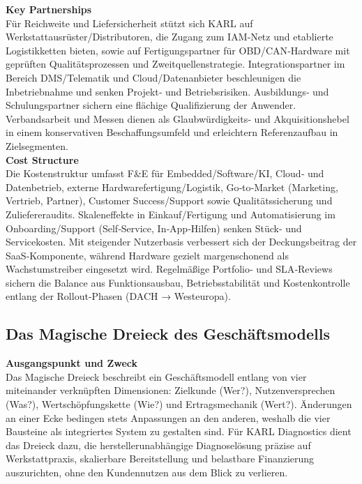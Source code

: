 \textbf{Key Partnerships}\\
Für Reichweite und Liefersicherheit stützt sich \ac{KARL} auf Werkstattausrüster/Distributoren, die Zugang zum \ac{IAM}‑Netz und etablierte Logistikketten bieten, sowie auf Fertigungspartner für \ac{OBD}/\ac{CAN}‑Hardware mit geprüften Qualitätsprozessen und Zweitquellenstrategie. Integrationspartner im Bereich \ac{DMS}/Telematik und Cloud/Datenanbieter beschleunigen die Inbetriebnahme und senken Projekt‑ und Betriebsrisiken. Ausbildungs‑ und Schulungspartner sichern eine flächige Qualifizierung der Anwender. Verbandsarbeit und Messen dienen als Glaubwürdigkeits‑ und Akquisitionshebel in einem konservativen Beschaffungsumfeld und erleichtern Referenzaufbau in Zielsegmenten. \\

\textbf{Cost Structure} \\
Die Kostenstruktur umfasst F\&E für Embedded/Software/\ac{KI}, Cloud‑ und Datenbetrieb, externe Hardwarefertigung/Logistik, Go‑to‑Market (Marketing, Vertrieb, Partner), Customer Success/Support sowie Qualitätssicherung und Zuliefereraudits. Skaleneffekte in Einkauf/Fertigung und Automatisierung im Onboarding/Support (Self‑Service, In‑App‑Hilfen) senken Stück- und Servicekosten. Mit steigender Nutzerbasis verbessert sich der Deckungsbeitrag der \ac{SaaS}‑Komponente, während Hardware gezielt margenschonend als Wachstumstreiber eingesetzt wird. Regelmäßige Portfolio‑ und \ac{SLA}‑Reviews sichern die Balance aus Funktionsausbau, Betriebsstabilität und Kostenkontrolle entlang der Rollout‑Phasen (DACH → Westeuropa). \\

\subsection{Das Magische Dreieck des Geschäftsmodells}

\textbf{Ausgangspunkt und Zweck}\\
Das Magische Dreieck beschreibt ein Geschäftsmodell entlang von vier miteinander verknüpften Dimensionen: Zielkunde (Wer?), Nutzenversprechen (Was?), Wertschöpfungskette (Wie?) und Ertragsmechanik (Wert?). Änderungen an einer Ecke bedingen stets Anpassungen an den anderen, weshalb die vier Bausteine als integriertes System zu gestalten sind. Für KARL Diagnostics dient das Dreieck dazu, die herstellerunabhängige Diagnoselösung präzise auf Werkstattpraxis, skalierbare Bereitstellung und belastbare Finanzierung auszurichten, ohne den Kundennutzen aus dem Blick zu verlieren.\\

